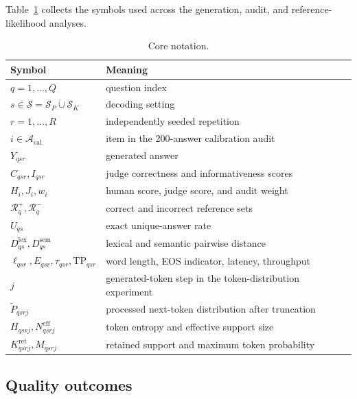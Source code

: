 \documentclass[11pt]{article}
\begin{document}
Table~\ref{tab:notation} collects the symbols used across the generation,
audit, and reference-likelihood analyses.

\begin{table}[ht]
\centering
\small
\caption{Core notation.}
\label{tab:notation}
\begin{tabular}{@{}ll@{}}
\toprule
Symbol & Meaning \\
\midrule
$q=1,\ldots,Q$ & question index \\
$s\in\mathcal S=\mathcal S_P\mathbin{\dot\cup}\mathcal S_K$ & decoding setting \\
$r=1,\ldots,R$ & independently seeded repetition \\
$i\in\mathcal A_{\mathrm{cal}}$ & item in the 200-answer calibration audit \\
$Y_{qsr}$ & generated answer \\
$C_{qsr},I_{qsr}$ & judge correctness and informativeness scores \\
$H_i,J_i,w_i$ & human score, judge score, and audit weight \\
$\mathcal R_q^+,\mathcal R_q^-$ & correct and incorrect reference sets \\
$U_{qs}$ & exact unique-answer rate \\
$D^{\mathrm{lex}}_{qs},D^{\mathrm{sem}}_{qs}$ & lexical and semantic pairwise distance \\
$\ell_{qsr},E_{qsr},\tau_{qsr},\mathrm{TP}_{qsr}$ & word length, EOS indicator, latency, throughput \\
$j$ & generated-token step in the token-distribution experiment \\
$\widetilde P_{qsrj}$ & processed next-token distribution after truncation \\
$H_{qsrj},N^{\mathrm{eff}}_{qsrj}$ & token entropy and effective support size \\
$K^{\mathrm{ret}}_{qsrj},M_{qsrj}$ & retained support and maximum token probability \\
\bottomrule
\end{tabular}
\end{table}

\subsection{Quality outcomes}
\end{document}
